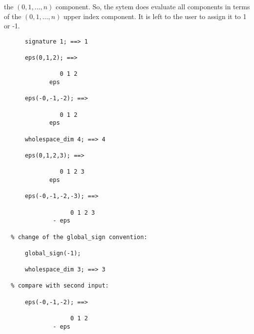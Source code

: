 the $(0,1,\ldots,n)$ component. So, the sytem does evaluate all components
in terms of  the $(0,1,\ldots,n)$ upper index component. It is left to the user 
to assign it to 1 or -1.
\begin{verbatim}
      signature 1; ==> 1

      eps(0,1,2); ==> 

                0 1 2
             eps

      eps(-0,-1,-2); ==>

                0 1 2
             eps

      wholespace_dim 4; ==> 4

      eps(0,1,2,3); ==>

                0 1 2 3
             eps

      eps(-0,-1,-2,-3); ==>

                   0 1 2 3
              - eps

  % change of the global_sign convention: 
   
      global_sign(-1);

      wholespace_dim 3; ==> 3

  % compare with second input:

      eps(-0,-1,-2); ==>

                   0 1 2
              - eps

\end{verbatim}

